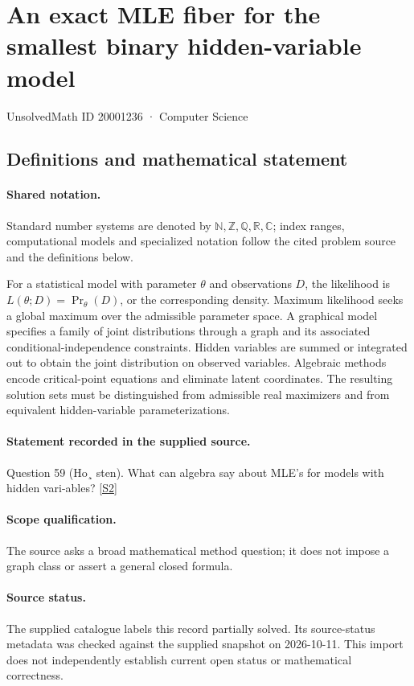 \documentclass[11pt]{article}
\newcommand{\sref}[2]{\hyperlink{source:#1:#2}{[S#2]}}
\begin{document}
\setcounter{section}{20001235}
\section{An exact MLE fiber for the smallest binary hidden-variable model}\label{20001236}
{\small\sffamily UnsolvedMath ID 20001236 · Computer Science}
\subsection{Definitions and mathematical statement}

\paragraph{Shared notation.}Standard number systems are denoted by $\mathbb N,\mathbb Z,\mathbb Q,\mathbb R,\mathbb C$; index ranges, computational models and specialized notation follow the cited problem source and the definitions below.


For a statistical model with parameter $\theta$ and observations $D$, the likelihood is $L(\theta;D)=\Pr_\theta(D)$, or the corresponding density. Maximum likelihood seeks a global maximum over the admissible parameter space. A graphical model specifies a family of joint distributions through a graph and its associated conditional-independence constraints. Hidden variables are summed or integrated out to obtain the joint distribution on observed variables. Algebraic methods encode critical-point equations and eliminate latent coordinates. The resulting solution sets must be distinguished from admissible real maximizers and from equivalent hidden-variable parameterizations.
\paragraph{Statement recorded in the supplied source.}
Question 59 (Ho¸ sten). What can algebra say about MLE's for models with hidden vari-ables? \sref{20001236}{2}
\paragraph{Scope qualification.}
The source asks a broad mathematical method question; it does not impose a graph class or assert a general closed formula.
\paragraph{Source status.}
The supplied catalogue labels this record partially solved. Its source-status metadata was checked against the supplied snapshot on 2026-10-11. This import does not independently establish current open status or mathematical correctness.
\end{document}
